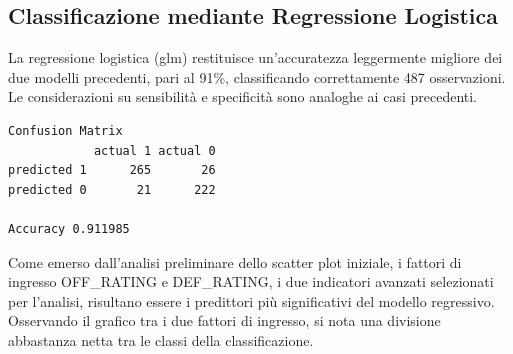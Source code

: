 \documentclass[11pt,a4paper]{article}
\begin{document}
\subsection{Classificazione mediante Regressione Logistica}
La regressione logistica (glm) restituisce un'accuratezza leggermente migliore dei due modelli precedenti, pari al 91\%, classificando correttamente 487 osservazioni. Le considerazioni su sensibilità e specificità sono analoghe ai casi precedenti.

\begin{lstlisting}[language=bash,basicstyle=\tiny,tabsize=2,frame = single]
Confusion Matrix
            actual 1 actual 0
predicted 1      265       26
predicted 0       21      222

Accuracy 0.911985
\end{lstlisting}

Come emerso dall'analisi preliminare dello scatter plot iniziale, i fattori di ingresso OFF\_RATING e DEF\_RATING, i due indicatori avanzati selezionati per l'analisi, risultano essere i predittori più significativi del modello regressivo. Osservando il grafico tra i due fattori di ingresso, si nota una divisione abbastanza netta tra le classi della classificazione.
\end{document}
